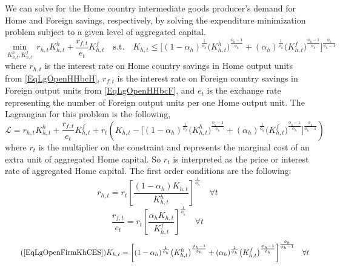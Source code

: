     We can solve for the Home country intermediate goods producer's demand for Home and Foreign savings, respectively, by solving the expenditure minimization problem subject to a given level of aggregated capital.
    \begin{equation}\label{EqLgOpenFirmMinProbH}
      \min_{K^h_{h,t},K^f_{h,t}} \: r_{h,t} K^h_{h,t} + \frac{r_{f,t}}{e_t}K^f_{h,t} \quad \text{s.t.} \quad K_{h,t} \leq \biggl[(1 - \alpha_h)^\frac{1}{\phi_h}\bigl(K^h_{h,t}\bigr)^\frac{\phi_h-1}{\phi_h} + (\alpha_h)^\frac{1}{\phi_h}\bigl(K^f_{h,t}\bigr)^\frac{\phi_h-1}{\phi_h}\biggr]^\frac{\phi_h}{\phi_h-1}
    \end{equation}
    where $r_{h,t}$ is the interest rate on Home country savings in Home output units from \eqref{EqLgOpenHHbcH}, $r_{f,t}$ is the interest rate on Foreign country savings in Foreign output units from \eqref{EqLgOpenHHbcF}, and $e_t$ is the exchange rate representing the number of Foreign output units per one Home output unit. The Lagrangian for this problem is the following,
    \begin{equation}\label{EqLgOpenFirmlagrH}
      \mathcal{L} = r_{h,t}K^h_{h,t} + \frac{r_{f,t}}{e_t}K^f_{h,t} + r_t\left(K_{h,t} - \biggl[(1 - \alpha_h)^\frac{1}{\phi_h}\bigl(K^h_{h,t}\bigr)^\frac{\phi_h-1}{\phi_h} + (\alpha_h)^\frac{1}{\phi_h}\bigl(K^f_{h,t}\bigr)^\frac{\phi_h-1}{\phi_h}\biggr]^\frac{\phi_h}{\phi_h-1}\right)
    \end{equation}
    where $r_t$ is the multiplier on the constraint and represents the marginal cost of an extra unit of aggregated Home capital. So $r_t$ is interpreted as the price or interest rate of aggregated Home capital. The first order conditions are the following:
    \begin{equation}\label{EqLgOpenFirmfocKhh}
      r_{h,t} = r_t\left[\frac{(1-\alpha_h)K_{h,t}}{K^h_{h,t}}\right]^{\frac{1}{\phi_h}} \quad\forall t
    \end{equation}
    \begin{equation}\label{EqLgOpenFirmfocKhf}
      \frac{r_{f,t}}{e_t} = r_t\left[\frac{\alpha_h K_{h,t}}{K^f_{h,t}}\right]^{\frac{1}{\phi_h}} \quad\forall t
    \end{equation}
    \begin{equation}\tag{\ref{EqLgOpenFirmKhCES}}
      K_{h,t}= \biggl[(1 - \alpha_h)^\frac{1}{\phi_h}\bigl(K^h_{h,t}\bigr)^\frac{\phi_h-1}{\phi_h} + (\alpha_h)^\frac{1}{\phi_h}\bigl(K^f_{h,t}\bigr)^\frac{\phi_h-1}{\phi_h}\biggr]^\frac{\phi_h}{\phi_h-1} \quad\forall t
    \end{equation}
